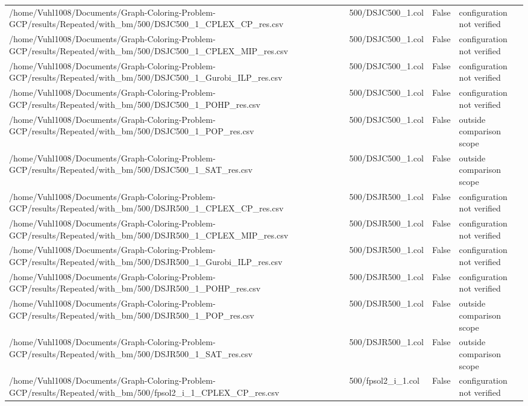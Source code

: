 \begin{table}[htbp]
\begin{tabular}{llll}
/home/Vuhl1008/Documents/Graph-Coloring-Problem-GCP/results/Repeated/with\_bm/500/DSJC500\_1\_CPLEX\_CP\_res.csv & 500/DSJC500\_1.col & False & configuration not verified \\
/home/Vuhl1008/Documents/Graph-Coloring-Problem-GCP/results/Repeated/with\_bm/500/DSJC500\_1\_CPLEX\_MIP\_res.csv & 500/DSJC500\_1.col & False & configuration not verified \\
/home/Vuhl1008/Documents/Graph-Coloring-Problem-GCP/results/Repeated/with\_bm/500/DSJC500\_1\_Gurobi\_ILP\_res.csv & 500/DSJC500\_1.col & False & configuration not verified \\
/home/Vuhl1008/Documents/Graph-Coloring-Problem-GCP/results/Repeated/with\_bm/500/DSJC500\_1\_POHP\_res.csv & 500/DSJC500\_1.col & False & configuration not verified \\
/home/Vuhl1008/Documents/Graph-Coloring-Problem-GCP/results/Repeated/with\_bm/500/DSJC500\_1\_POP\_res.csv & 500/DSJC500\_1.col & False & outside comparison scope \\
/home/Vuhl1008/Documents/Graph-Coloring-Problem-GCP/results/Repeated/with\_bm/500/DSJC500\_1\_SAT\_res.csv & 500/DSJC500\_1.col & False & outside comparison scope \\
/home/Vuhl1008/Documents/Graph-Coloring-Problem-GCP/results/Repeated/with\_bm/500/DSJR500\_1\_CPLEX\_CP\_res.csv & 500/DSJR500\_1.col & False & configuration not verified \\
/home/Vuhl1008/Documents/Graph-Coloring-Problem-GCP/results/Repeated/with\_bm/500/DSJR500\_1\_CPLEX\_MIP\_res.csv & 500/DSJR500\_1.col & False & configuration not verified \\
/home/Vuhl1008/Documents/Graph-Coloring-Problem-GCP/results/Repeated/with\_bm/500/DSJR500\_1\_Gurobi\_ILP\_res.csv & 500/DSJR500\_1.col & False & configuration not verified \\
/home/Vuhl1008/Documents/Graph-Coloring-Problem-GCP/results/Repeated/with\_bm/500/DSJR500\_1\_POHP\_res.csv & 500/DSJR500\_1.col & False & configuration not verified \\
/home/Vuhl1008/Documents/Graph-Coloring-Problem-GCP/results/Repeated/with\_bm/500/DSJR500\_1\_POP\_res.csv & 500/DSJR500\_1.col & False & outside comparison scope \\
/home/Vuhl1008/Documents/Graph-Coloring-Problem-GCP/results/Repeated/with\_bm/500/DSJR500\_1\_SAT\_res.csv & 500/DSJR500\_1.col & False & outside comparison scope \\
/home/Vuhl1008/Documents/Graph-Coloring-Problem-GCP/results/Repeated/with\_bm/500/fpsol2\_i\_1\_CPLEX\_CP\_res.csv & 500/fpsol2\_i\_1.col & False & configuration not verified \\

\end{tabular}
\end{table}
